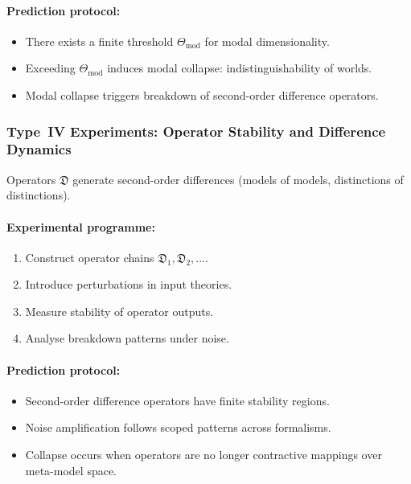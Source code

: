 \paragraph{Prediction protocol:}

\begin{itemize}
    \item There exists a finite threshold $\Theta_{\mathrm{mod}}$ for 
          modal dimensionality.
    \item Exceeding $\Theta_{\mathrm{mod}}$ induces modal collapse:
          indistinguishability of worlds.
    \item Modal collapse triggers breakdown of 
          second-order difference operators.
\end{itemize}



\subsubsection{Type~IV Experiments: Operator Stability and Difference Dynamics}

Operators $\mathfrak{D}$ generate second-order differences 
(models of models, distinctions of distinctions).

\paragraph{Experimental programme:}

\begin{enumerate}
    \item Construct operator chains $\mathfrak{D}_1, \mathfrak{D}_2, \dots$.
    \item Introduce perturbations in input theories.
    \item Measure stability of operator outputs.
    \item Analyse breakdown patterns under noise.
\end{enumerate}

\paragraph{Prediction protocol:}

\begin{itemize}
    \item Second-order difference operators have finite stability regions.
    \item Noise amplification follows scoped patterns across formalisms.
    \item Collapse occurs when operators are no longer 
          contractive mappings over meta-model space.
\end{itemize}



